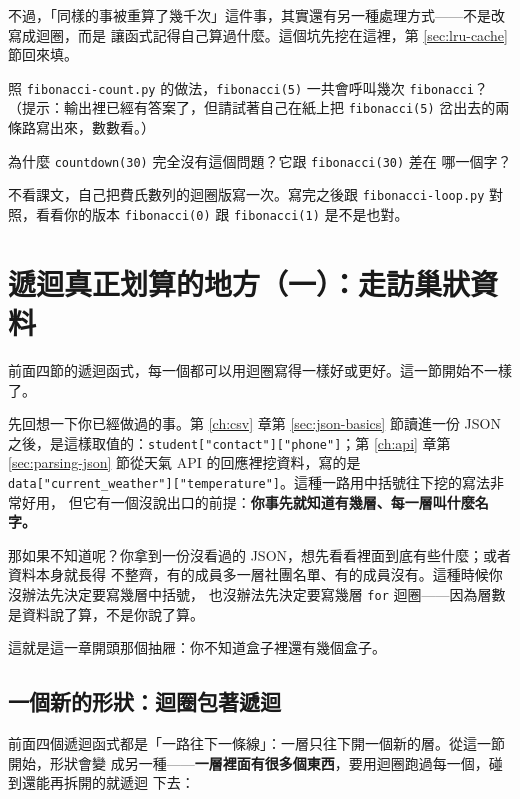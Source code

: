 不過，「同樣的事被重算了幾千次」這件事，其實還有另一種處理方式——不是改寫成迴圈，而是
讓函式記得自己算過什麼。這個坑先挖在這裡，第 \ref{sec:lru-cache} 節回來填。

\begin{drills}[label=drills:fibonacci-cost]
\item 照 \texttt{fibonacci-count.py} 的做法，\texttt{fibonacci(5)} 一共會呼叫幾次
\texttt{fibonacci}？（提示：輸出裡已經有答案了，但請試著自己在紙上把
\texttt{fibonacci(5)} 岔出去的兩條路寫出來，數數看。）
\item 為什麼 \texttt{countdown(30)} 完全沒有這個問題？它跟 \texttt{fibonacci(30)} 差在
哪一個字？
\item 不看課文，自己把費氏數列的迴圈版寫一次。寫完之後跟 \texttt{fibonacci-loop.py}
對照，看看你的版本 \texttt{fibonacci(0)} 跟 \texttt{fibonacci(1)} 是不是也對。
\end{drills}

\section{遞迴真正划算的地方（一）：走訪巢狀資料}
\label{sec:nested-data-walk}

前面四節的遞迴函式，每一個都可以用迴圈寫得一樣好或更好。這一節開始不一樣了。

先回想一下你已經做過的事。第 \ref{ch:csv} 章第 \ref{sec:json-basics} 節讀進一份 JSON
之後，是這樣取值的：\texttt{student["contact"]["phone"]}；第 \ref{ch:api} 章第
\ref{sec:parsing-json} 節從天氣 API 的回應裡挖資料，寫的是
\texttt{data["current\_weather"]["temperature"]}。這種一路用中括號往下挖的寫法非常好用，
但它有一個沒說出口的前提：\textbf{你事先就知道有幾層、每一層叫什麼名字。}

那如果不知道呢？你拿到一份沒看過的 JSON，想先看看裡面到底有些什麼；或者資料本身就長得
不整齊，有的成員多一層社團名單、有的成員沒有。這種時候你沒辦法先決定要寫幾層中括號，
也沒辦法先決定要寫幾層 \texttt{for} 迴圈——因為層數是資料說了算，不是你說了算。

這就是這一章開頭那個抽屜：你不知道盒子裡還有幾個盒子。

\subsection*{一個新的形狀：迴圈包著遞迴}

前面四個遞迴函式都是「一路往下一條線」：一層只往下開一個新的層。從這一節開始，形狀會變
成另一種——\textbf{一層裡面有很多個東西}，要用迴圈跑過每一個，碰到還能再拆開的就遞迴
下去：

